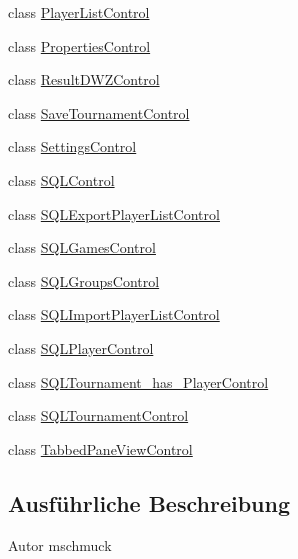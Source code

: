 \begin{DoxyCompactItemize}
\item 
class \hyperlink{classde_1_1turnierverwaltung_1_1control_1_1_player_list_control}{Player\+List\+Control}
\item 
class \hyperlink{classde_1_1turnierverwaltung_1_1control_1_1_properties_control}{Properties\+Control}
\item 
class \hyperlink{classde_1_1turnierverwaltung_1_1control_1_1_result_d_w_z_control}{Result\+D\+W\+Z\+Control}
\item 
class \hyperlink{classde_1_1turnierverwaltung_1_1control_1_1_save_tournament_control}{Save\+Tournament\+Control}
\item 
class \hyperlink{classde_1_1turnierverwaltung_1_1control_1_1_settings_control}{Settings\+Control}
\item 
class \hyperlink{classde_1_1turnierverwaltung_1_1control_1_1_s_q_l_control}{S\+Q\+L\+Control}
\item 
class \hyperlink{classde_1_1turnierverwaltung_1_1control_1_1_s_q_l_export_player_list_control}{S\+Q\+L\+Export\+Player\+List\+Control}
\item 
class \hyperlink{classde_1_1turnierverwaltung_1_1control_1_1_s_q_l_games_control}{S\+Q\+L\+Games\+Control}
\item 
class \hyperlink{classde_1_1turnierverwaltung_1_1control_1_1_s_q_l_groups_control}{S\+Q\+L\+Groups\+Control}
\item 
class \hyperlink{classde_1_1turnierverwaltung_1_1control_1_1_s_q_l_import_player_list_control}{S\+Q\+L\+Import\+Player\+List\+Control}
\item 
class \hyperlink{classde_1_1turnierverwaltung_1_1control_1_1_s_q_l_player_control}{S\+Q\+L\+Player\+Control}
\item 
class \hyperlink{classde_1_1turnierverwaltung_1_1control_1_1_s_q_l_tournament__has___player_control}{S\+Q\+L\+Tournament\+\_\+has\+\_\+\+Player\+Control}
\item 
class \hyperlink{classde_1_1turnierverwaltung_1_1control_1_1_s_q_l_tournament_control}{S\+Q\+L\+Tournament\+Control}
\item 
class \hyperlink{classde_1_1turnierverwaltung_1_1control_1_1_tabbed_pane_view_control}{Tabbed\+Pane\+View\+Control}
\end{DoxyCompactItemize}


\subsection{Ausführliche Beschreibung}
\begin{DoxyAuthor}{Autor}
mschmuck 
\end{DoxyAuthor}
